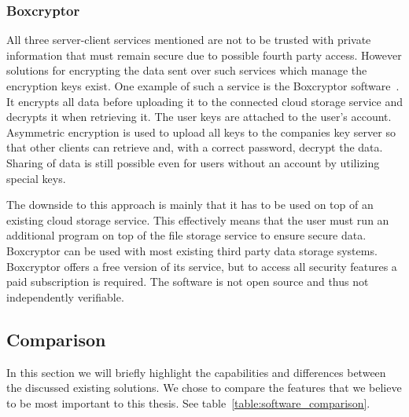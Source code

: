 \subsubsection{Boxcryptor}
\label{subs:Boxcryptor}

All three server-client services mentioned are not to be trusted with private information that must remain secure due to possible fourth party access.
However solutions for encrypting the data sent over such services which manage the encryption keys exist.
One example of such a service is the Boxcryptor software~\cite{web:site:boxcryptor}.
It encrypts all data before uploading it to the connected cloud storage service and decrypts it when retrieving it.
The user keys are attached to the user's account.
Asymmetric encryption is used to upload all keys to the companies key server so that other clients can retrieve and, with a correct password, decrypt the data.
Sharing of data is still possible even for users without an account by utilizing special keys.

The downside to this approach is mainly that it has to be used on top of an existing cloud storage service.
This effectively means that the user must run an additional program on top of the file storage service to ensure secure data.
Boxcryptor can be used with most existing third party data storage systems.
Boxcryptor offers a free version of its service, but to access all security features a paid subscription is required.
The software is not open source and thus not independently verifiable.

\subsection{Comparison}
\label{sub:Comparison}

In this section we will briefly highlight the capabilities and differences between the discussed existing solutions.
We chose to compare the features that we believe to be most important to this thesis.
See table~\ref{table:software_comparison}.

